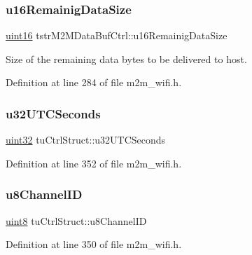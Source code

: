\subsubsection{\texorpdfstring{u16\+Remainig\+Data\+Size}{u16RemainigDataSize}}
{\footnotesize\ttfamily \hyperlink{group__DataT_ga1daa745171fc6e31d942c161422a76f9}{uint16} tstr\+M2\+M\+Data\+Buf\+Ctrl\+::u16\+Remainig\+Data\+Size}

Size of the remaining data bytes to be delivered to host. 

Definition at line 284 of file m2m\+\_\+wifi.\+h.

\mbox{\label{group__WifiSetCustInfoElementFn_ga1f606ddf58bcc3b277df02eba2bcddd0}} 
\subsubsection{\texorpdfstring{u32\+U\+T\+C\+Seconds}{u32UTCSeconds}}
{\footnotesize\ttfamily \hyperlink{group__DataT_ga100e7c691a47d6978527c479a0158245}{uint32} tu\+Ctrl\+Struct\+::u32\+U\+T\+C\+Seconds}



Definition at line 352 of file m2m\+\_\+wifi.\+h.

\mbox{\label{group__WifiSetCustInfoElementFn_gacafdeb10d6414675b5e85687a9392ebc}} 
\subsubsection{\texorpdfstring{u8\+Channel\+ID}{u8ChannelID}}
{\footnotesize\ttfamily \hyperlink{group__DataT_ga4df709a77647e870bbf1d955b8edc9a6}{uint8} tu\+Ctrl\+Struct\+::u8\+Channel\+ID}



Definition at line 350 of file m2m\+\_\+wifi.\+h.

